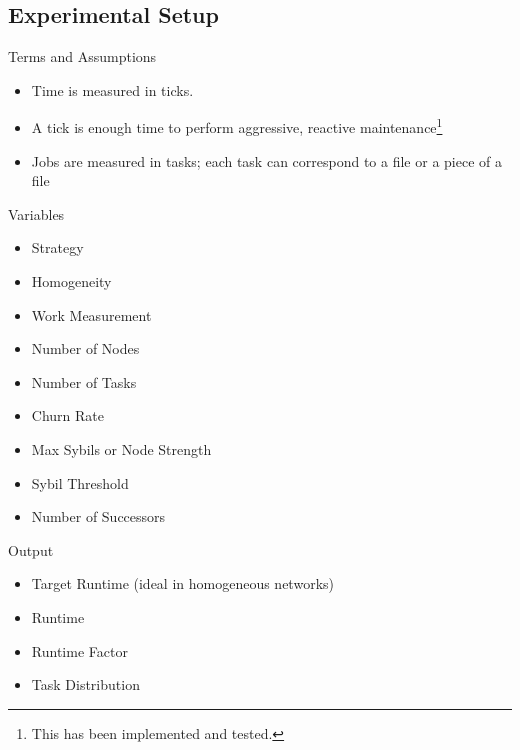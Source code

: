 \documentclass[11pt]{beamer}
\begin{document}
\subsection{Experimental Setup}
\begin{frame}{Terms and Assumptions}
	\begin{itemize}
		
		\item Time is measured in ticks.
		\item A tick is enough time to perform aggressive, reactive maintenance\footnote{This has been implemented and tested.}
		\item Jobs are measured in tasks; each task can correspond to a file or a piece of a file
		
	\end{itemize}
\end{frame}




\begin{frame}{Variables}
	\begin{itemize}
		
		\item Strategy
		\item Homogeneity 
		\item Work Measurement
		\item Number of Nodes
		\item Number of Tasks
		\item Churn Rate 
		\item Max Sybils or Node Strength
		\item Sybil Threshold 
		\item Number of Successors
	\end{itemize}
\end{frame}


\begin{frame}{Output}
	\begin{itemize}
		
		\item Target Runtime (ideal in homogeneous networks)
		\item Runtime
		\item Runtime Factor
		\item Task Distribution
	\end{itemize}
\end{frame}

\end{document}

